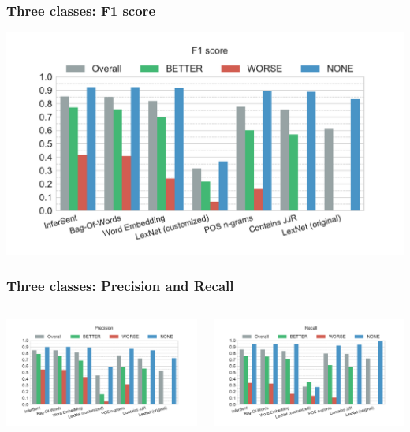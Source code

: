 \documentclass[11pt,aspectratio=169]{beamer}
\begin{document}
    \begin{frame}
        \frametitle{Three classes: F1 score}
        \centerline{\includegraphics[scale=0.45,trim={0 0 0 0.5cm},clip]{images/experiments/hp-f1-False}}
    \end{frame}


    \begin{frame}
        \frametitle{Three classes: Precision and Recall}
        \begin{columns}[t]
            \column{2in}
            \centerline{\includegraphics[scale=0.31,trim={2cm 0 0 0},clip]{images/experiments/hp-precision-False}}
            \column{2in}
            \centerline{\includegraphics[scale=0.31,trim={0 0 2cm 0},clip]{images/experiments/hp-recall-False}}

        \end{columns}
    \end{frame}
\end{document}
